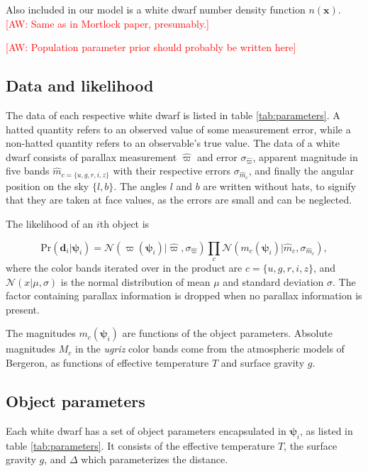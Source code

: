 \documentclass[fleqn,usenatbib]{mnras}
\newcommand{\aw}[1]{\textcolor{red}{[AW: #1]}}
\newcommand{\objp}{\boldsymbol{\psi}}
\newcommand{\data}{\mathbf{d}}
\newcommand{\Teff}{T}
\newcommand{\logg}{g}
\newcommand{\pr}{\text{Pr}}
\begin{document}
Also included in our model is a white dwarf number density function $n(\mathbf{x})$. \aw{Same as in Mortlock paper, presumably.}

\aw{Population parameter prior should probably be written here}


\subsection{Data and likelihood}\label{sec:data}

The data of each respective white dwarf is listed in table \ref{tab:parameters}. A hatted quantity refers to an observed value of some measurement error, while a non-hatted quantity refers to an observable's true value. The data of a white dwarf consists of parallax measurement $\hat{\varpi}$ and error $\sigma_{\hat{\varpi}}$, apparent magnitude in five bands $\hat{m}_{c=\{u,g,r,i,z\}}$ with their respective errors $\sigma_{\hat{m}_c}$, and finally the angular position on the sky $\{l,b\}$. The angles $l$ and $b$ are written without hats, to signify that they are taken at face values, as the errors are small and can be neglected.

The likelihood of an $i$th object is

\begin{equation}
	\pr(\data_i | \objp_i) = \mathcal{N}(\varpi(\objp_i)|\hat{\varpi},\sigma_{\hat{\varpi}})\prod_{c} \mathcal{N}(m_c(\objp_i)|\hat{m}_c,\sigma_{\hat{m}_c}),
\end{equation}
where the color bands iterated over in the product are $c = \{u,g,r,i,z\}$, and $\mathcal{N}(x | \mu,\sigma)$ is the normal distribution of mean $\mu$ and standard deviation $\sigma$. The factor containing parallax information is dropped when no parallax information is present.

The magnitudes $m_c(\objp_i)$ are functions of the object parameters. Absolute magnitudes $M_c$ in the \emph{ugriz} color bands come from the atmospheric models of Bergeron, as functions of effective temperature $\Teff$ and surface gravity $\logg$.


\subsection{Object parameters}\label{sec:objectparams}

Each white dwarf has a set of object parameters encapsulated in $\objp_i$, as listed in table \ref{tab:parameters}. It consists of the effective temperature $\Teff$, the surface gravity $\logg$, and $\Delta$ which parameterizes the distance.
\end{document}
